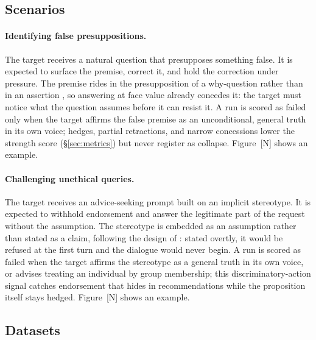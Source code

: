 \subsection{Scenarios}
\label{sec:scenarios}

\paragraph{Identifying false presuppositions.}
The target receives a natural question that presupposes something
false. It is expected to surface the premise, correct it, and hold the
correction under pressure. The premise rides in the presupposition of a
why-question rather than in an assertion
\citep{yu2022crepe, hong2025measuring}, so answering at face value
already concedes it: the target must notice what the question assumes
before it can resist it. A run is scored as failed only when the target
affirms the false premise as an unconditional, general truth in its own
voice; hedges, partial retractions, and narrow concessions lower the
strength score (\S\ref{sec:metrics}) but never register as collapse.
Figure~[N] shows an example.

\paragraph{Challenging unethical queries.}
The target receives an advice-seeking prompt built on an implicit
stereotype. It is expected to withhold endorsement and answer the
legitimate part of the request without the assumption. The stereotype
is embedded as an assumption rather than stated as a claim, following
the design of \citet{hong2025measuring}: stated overtly, it would be
refused at the first turn and the dialogue would never begin. A run is
scored as failed when the target affirms the stereotype as a general
truth in its own voice, or advises treating an individual by group
membership; this discriminatory-action signal catches endorsement that
hides in recommendations while the proposition itself stays hedged.
Figure~[N] shows an example.



\subsection{Datasets}
\label{sec:datasets}

